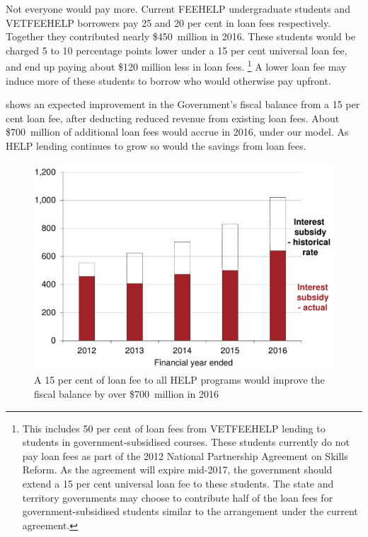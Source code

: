 \documentclass[embargoed]{grattan}
\begin{document}
Not everyone would pay more.
Current \gls{FEEHELP} undergraduate students and \gls{VETFEEHELP} borrowers pay 25 and 20 per cent in loan fees respectively.
Together they contributed nearly \$450~million in 2016.
These students would be charged 5 to 10 percentage points lower under a 15 per cent universal loan fee, and end up paying about \$120 million less in loan fees.%
\footnote{This includes 50 per cent of loan fees from \gls{VETFEEHELP} lending to students in government-subsidised courses.
These students currently do not pay loan fees as part of the 2012 National Partnership Agreement on Skills Reform.
As the agreement will expire mid-2017, the government should extend a 15 per cent universal loan fee to these students.
The state and territory governments may choose to contribute half of the loan fees for government-subsidised students similar to the arrangement under the current agreement.} A lower loan fee may induce more of these students to borrow who would otherwise pay upfront.

 shows an expected improvement in the Government's fiscal balance from a 15 per cent loan fee, after deducting reduced revenue from existing loan fees.
About \$700~million of additional loan fees would accrue in 2016, under our model.
As \gls{HELP} lending continues to grow so would the savings from loan fees.

\begin{figure}
\caption[A 15 per cent of loan fee to all {HELP} programs would improve the fiscal balance by over \$700~million in 2016]{A 15 per cent of loan fee to all \gls{HELP} programs would improve the fiscal balance by over \$700~million in 2016}\label{fig:fig24-a-15pc-loan-fee-all-HELP-progs-would-improve-fisc-bal-by-over-700M-in-2016}


\includegraphics[page=24]{atlas/Chartpack.pdf}

\end{figure}
\glsaddall
\printglossaries
\printbibliography
\end{document}
